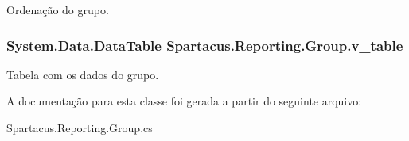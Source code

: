 Ordenação do grupo. 

\hypertarget{classSpartacus_1_1Reporting_1_1Group_a589c6ed49699af44ceefd1ec283de54c}{
\subsubsection[{v\+\_\+table}]{\setlength{\rightskip}{0pt plus 5cm}System.\+Data.\+Data\+Table Spartacus.\+Reporting.\+Group.\+v\+\_\+table}}\label{classSpartacus_1_1Reporting_1_1Group_a589c6ed49699af44ceefd1ec283de54c}


Tabela com os dados do grupo. 



A documentação para esta classe foi gerada a partir do seguinte arquivo\+:\begin{DoxyCompactItemize}
\item 
Spartacus.\+Reporting.\+Group.\+cs\end{DoxyCompactItemize}

